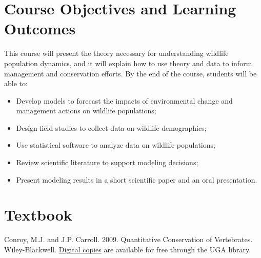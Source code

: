 \documentclass[12pt]{article}
\begin{document}
\vspace{-3mm}
\section*{\normalsize Course Objectives and Learning Outcomes}
\vspace{-4mm}
This course will present the theory necessary for understanding
wildlife population dynamics, and it will explain how to use theory
and data to inform management and conservation efforts. By the end of 
the course, students will be able to:

\begin{itemize}
  \item Develop models to forecast the impacts of environmental change
    and management actions on wildlife populations;
  \item Design field studies to collect data on wildlife demographics;
  \item Use statistical software to analyze data on wildlife populations;
  \item Review scientific literature to support modeling decisions;
  \item Present modeling results in a short scientific paper and an
    oral presentation. 
\end{itemize}

\vspace{-3mm}
\section*{\normalsize Textbook}
\vspace{-4mm}
Conroy, M.J. and J.P. Carroll. 2009. Quantitative Conservation of
Vertebrates. Wiley-Blackwell. \href{http://preproxy.galib.uga.edu/login?url=http://onlinelibrary.wiley.com/book/10.1002/9781444303155}{Digital
  copies} are available for free through the UGA library. 

\vspace{-3mm}
\end{document}
